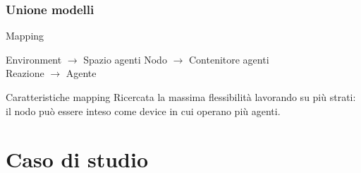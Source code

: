 \documentclass[handout]{beamer}\mode<presentation>{\usetheme{AMSCesenaBleu}}
\begin{document}

\begin{frame}
\frametitle{Unione modelli}
\begin{block}{Mapping}
\begin{center}
\alert{Environment} $\rightarrow$ Spazio agenti \hspace{1.5cm} \alert{Nodo} $\rightarrow$ Contenitore agenti
\\\vspace{0.4cm}
\alert{Reazione} $\rightarrow$ Agente
\end{center}
\end{block}

\begin{block}{Caratteristiche mapping}
Ricercata la massima flessibilità lavorando su più strati: il nodo può essere inteso come device in cui operano più agenti.
\end{block}
\end{frame}



\section{Caso di studio}
\end{document}
